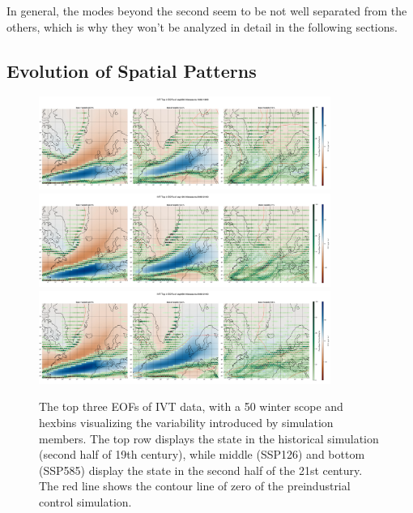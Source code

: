 In general, the modes beyond the second seem to be not well separated from the others, which is why they won't be analyzed in detail in the following sections. 

\subsection{Evolution of Spatial Patterns}
\label{sec:spatial pattern evolution}

\begin{figure}[htb]
  \begin{center}
    \includegraphics[width=0.85\textwidth]{figures/ivt_spat_patterns_hexbin_18501899_ssp585_50seasons.png}
    \includegraphics[width=0.85\textwidth]{figures/ivt_spat_patterns_hexbin_20502100_ssp126_50seasons.png}
    \includegraphics[width=0.85\textwidth]{figures/ivt_spat_patterns_hexbin_20502100_ssp585_50seasons.png}
  \end{center}
  \caption{The top three EOFs of IVT data, with a 50 winter scope and hexbins visualizing the variability introduced by simulation members. The top row displays the state in the historical simulation (second half of 19th century), while middle (SSP126) and bottom (SSP585) display the state in the second half of the 21st century. The red line shows the contour line of zero of the preindustrial control simulation. }\label{fig:ivt eof evolution}
\end{figure}


